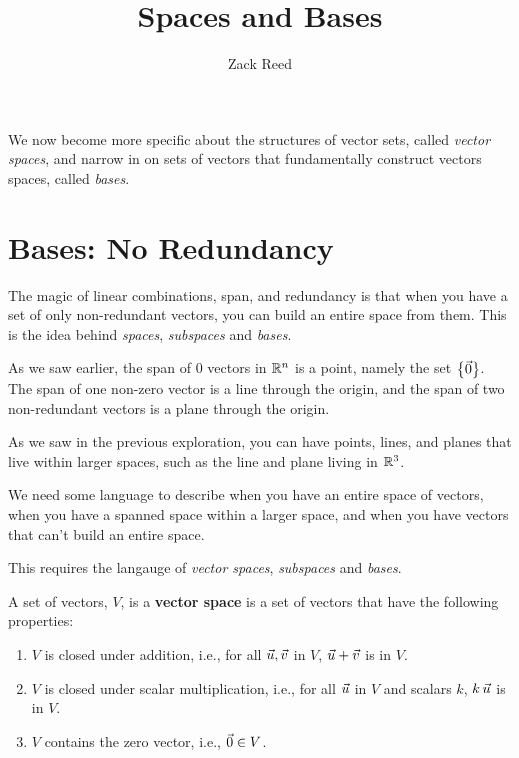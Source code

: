 \documentclass{ximera}
\author{Zack Reed}
\title{Spaces and Bases}
\begin{document}
\begin{abstract}

\end{abstract}
\maketitle

We now become more specific about the structures of vector sets, called \emph{vector spaces}, and narrow in on sets of vectors that fundamentally construct vectors spaces, called \emph{bases}.

\section*{Bases: No Redundancy}
  
  The magic of linear combinations, span, and redundancy is that when you have a set of only non-redundant vectors, you can build an entire space from them. This is the idea behind \emph{spaces}, \emph{subspaces} and \emph{bases}. 

  As we saw earlier, the span of 0 vectors in $\mathbb{R}^n$ is a point, namely the set $\left\{\vec{0}\right\}$. The span of one non-zero vector is a line
through the origin, and the span of two non-redundant vectors
is a plane through the origin.

As we saw in the previous exploration, you can have points, lines, and planes that live within larger spaces, such as the line and plane living in $\mathbb{R}^3$.

We need some language to describe when you have an entire space of vectors, when you have a spanned space within a larger space, and when you have vectors that can't build an entire space.

This requires the langauge of \emph{vector spaces}, \emph{subspaces} and \emph{bases}.



  \begin{definition}

    A set of vectors, $V$, is a \textbf{vector space} is a set of vectors that have the following properties:

    \begin{enumerate}
    
      \item $V$ is closed under addition, i.e., for all $\vec{u},\vec{v}$ in $V$, $\vec{u}+\vec{v}$ is in $V$.
      
      \item $V$ is closed under scalar multiplication, i.e., for all $\vec{u}$ in $V$ and scalars $k$, $k\,\vec{u}$ is in $V$.
      
      \item $V$ contains the zero vector, i.e., $\vec{0}\in V$.
    \end{enumerate}

  \end{definition}
\end{document}
